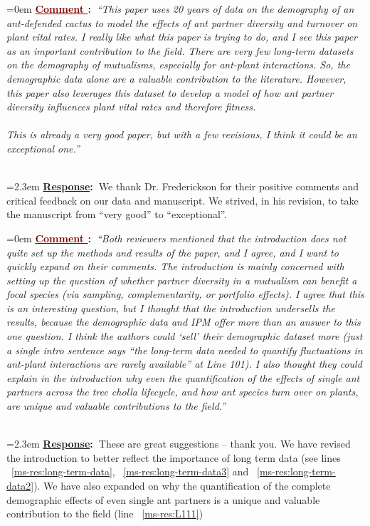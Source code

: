 \documentclass[12pt]{article}
\newcounter{cN}
\newcommand{\comment}[1]{
	\vspace{2em}
	\refstepcounter{cN} %
	\noindent \hangindent=0em \textbf{\textcolor{Maroon}{\uline{Comment \thecN}:~}}\emph{``#1''}
	}
\newcommand{\response}[1]{
	\\[0.25em]
	\hangindent=2.3em \textbf{\textcolor{NavyBlue}{\uline{Response}:~}}#1
	}
\begin{document}
\comment{This paper uses 20 years of data on the demography of an ant-defended cactus to model the effects of ant partner diversity and turnover on plant vital rates. I really like what this paper is trying to do, and I see this paper as an important contribution to the field. There are very few long-term datasets on the demography of mutualisms, especially for ant-plant interactions. So, the demographic data alone are a valuable contribution to the literature. However, this paper also leverages this dataset to develop a model of how ant partner diversity influences plant vital rates and therefore fitness.
\\
\\	
This is already a very good paper, but with a few revisions, I think it could be an exceptional one.}
\response{We thank Dr. Frederickson for their positive comments and critical feedback on our data and manuscript. We strived, in his revision, to take the manuscript from ``very good'' to ``exceptional''.}

\comment{Both reviewers mentioned that the introduction does not quite set up the methods and results of the paper, and I agree, and I want to quickly expand on their comments. 
The introduction is mainly concerned with setting up the question of whether partner diversity in a mutualism can benefit a focal species (via sampling, complementarity, or portfolio effects). 
I agree that this is an interesting question, but I thought that the introduction undersells the results, because the demographic data and IPM offer more than an answer to this one question. 
I think the authors could ‘sell’ their demographic dataset more (just a single intro sentence says “the long-term data needed to quantify fluctuations in ant-plant interactions are rarely available” at Line 101). 
I also thought they could explain in the introduction why even the quantification of the effects of single ant partners across the tree cholla lifecycle, and how ant species turn over on plants, are unique and valuable contributions to the field.}
\response{These are great suggestions -- thank you. We have revised the introduction to better reflect the importance of long term data (see lines ~\ref{ms-res:long-term-data}, ~\ref{ms-res:long-term-data3} and ~\ref{ms-res:long-term-data2}). 
We have also expanded on why the quantification of the complete demographic effects of even single ant partners is a unique and valuable contribution to the field (line ~\ref{ms-res:L111})
}
\end{document}
